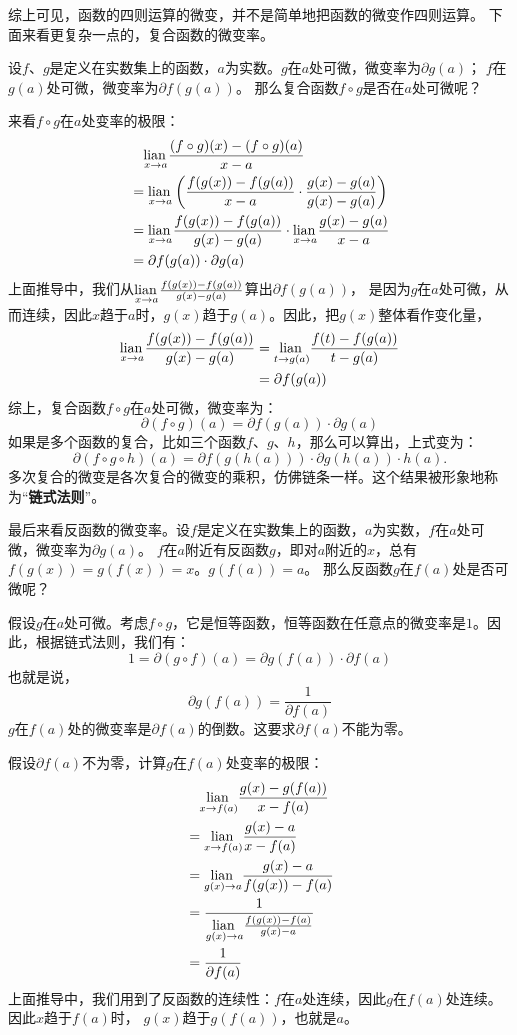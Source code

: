 \documentclass[12pt,UTF8]{ctexbook}
\begin{document}
综上可见，函数的四则运算的微变，并不是简单地把函数的微变作四则运算。
下面来看更复杂一点的，复合函数的微变率。

设$f$、$g$是定义在实数集上的函数，$a$为实数。$g$在$a$处可微，微变率为$\partial g(a)$；
$f$在$g(a)$处可微，微变率为$\partial f(g(a))$。
那么复合函数$f\circ g$是否在$a$处可微呢？

来看$f\circ g$在$a$处变率的极限：
\begin{align*}
    & \quad \underset{x\to a}{\operatorname{lian}\,} \frac{(f \circ g)(x) - (f \circ g)(a)}{x - a}  \\
    &= \underset{x\to a}{\operatorname{lian}\,} \left(\frac{f(g(x)) - f(g(a))}{x - a} \cdot \frac{g(x) - g(a)}{g(x) - g(a)}\right)  \\
    &= \underset{x\to a}{\operatorname{lian}\,} \frac{f(g(x)) - f(g(a))}{g(x) - g(a)} \cdot \underset{x\to a}{\operatorname{lian}\,} \frac{g(x) - g(a)}{x - a}  \\
    &= \partial f(g(a)) \cdot \partial g(a)  
\end{align*}
上面推导中，我们从$\underset{x\to a}{\operatorname{lian}\,} \frac{f(g(x)) - f(g(a))}{g(x) - g(a)}$算出$\partial f(g(a))$，
是因为$g$在$a$处可微，从而连续，因此$x$趋于$a$时，$g(x)$趋于$g(a)$。因此，把$g(x)$整体看作变化量，
\begin{align*}
    \underset{x\to a}{\operatorname{lian}\,} \frac{f(g(x)) - f(g(a))}{g(x) - g(a)} &= \underset{t\to g(a)}{\operatorname{lian}\,} \frac{f(t) - f(g(a))}{t - g(a)}  \\
    &= \partial f(g(a))  
\end{align*}
综上，复合函数$f\circ g$在$a$处可微，微变率为：
$$ \partial (f\circ g) (a) = \partial f(g(a)) \cdot \partial g(a)$$
如果是多个函数的复合，比如三个函数$f$、$g$、$h$，那么可以算出，上式变为：
$$ \partial (f\circ g \circ h) (a) = \partial f(g(h(a))) \cdot \partial g(h(a)) \cdot h(a).$$
多次复合的微变是各次复合的微变的乘积，仿佛链条一样。这个结果被形象地称为“\textbf{链式法则}”。

最后来看反函数的微变率。设$f$是定义在实数集上的函数，$a$为实数，$f$在$a$处可微，微变率为$\partial g(a)$。
$f$在$a$附近有反函数$g$，即对$a$附近的$x$，总有$f(g(x)) = g(f(x)) = x$。$g(f(a)) = a$。
那么反函数$g$在$f(a)$处是否可微呢？

假设$g$在$a$处可微。考虑$f\circ g$，它是恒等函数，恒等函数在任意点的微变率是$1$。因此，根据链式法则，我们有：
$$ 1 = \partial (g\circ f) (a) = \partial g(f(a)) \cdot \partial f(a)$$
也就是说，
$$ \partial g(f(a)) = \frac{1}{\partial f(a)} $$
$g$在$f(a)$处的微变率是$\partial f(a)$的倒数。这要求$\partial f(a)$不能为零。

假设$\partial f(a)$不为零，计算$g$在$f(a)$处变率的极限：
\begin{align*}
    & \quad \underset{x\to f(a)}{\operatorname{lian}\,} \frac{g(x) - g(f(a))}{x - f(a)}  \\
    &= \underset{x\to f(a)}{\operatorname{lian}\,} \frac{g(x) - a}{x - f(a)}  \\
    &= \underset{g(x)\to a}{\operatorname{lian}\,} \frac{g(x) - a}{f(g(x)) - f(a)}  \\
    &= \frac{1}{\underset{g(x)\to a}{\operatorname{lian}\,}\frac{f(g(x)) - f(a)}{g(x) - a}}  \\
    &= \frac{1}{\partial f(a)} 
\end{align*}
上面推导中，我们用到了反函数的连续性：$f$在$a$处连续，因此$g$在$f(a)$处连续。因此$x$趋于$f(a)$时，
$g(x)$趋于$g(f(a))$，也就是$a$。
\end{document}
